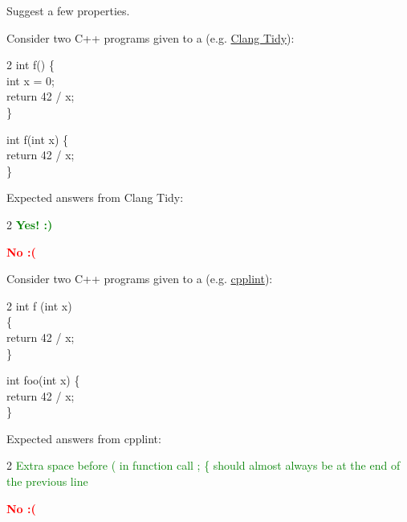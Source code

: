 \documentclass{article}
\begin{document}
Suggest a few properties.

\plush{}


Consider two C++ programs given to a  (e.g. \href{https://clang.llvm.org/extra/clang-tidy/}{Clang Tidy}):

\begin{multicols}{2}
{\ttfamily
int f() \{ \\
\quad int x = 0; \\
\quad return 42 / x; \\
\}}
\par\columnbreak\par
{\ttfamily
int f(int x) \{ \\
\quad return 42 / x; \\
\}}
\end{multicols}

Expected answers from Clang Tidy:

\begin{multicols}{2}
\textcolor{green}{\textbf{Yes! :)}}
\par\columnbreak\par
\textcolor{red}{\textbf{No :(}}
\end{multicols}

\plush{}


Consider two C++ programs given to a  (e.g. \href{https://github.com/cpplint/cpplint}{cpplint}):

\begin{multicols}{2}
{\ttfamily
int f (int x) \\
\{ \\
\quad return 42 / x; \\
\}}
\par\columnbreak\par
{\ttfamily
int foo(int x) \{ \\
\quad return 42 / x; \\
\}}
\end{multicols}

Expected answers from cpplint:

\begin{multicols}{2}
\textcolor{green}{{\ttfamily Extra space before ( in function call ; \{ should almost always be at the end of the previous line}}
\par\columnbreak\par
\textcolor{red}{\textbf{No :(}}
\end{multicols}
\end{document}

